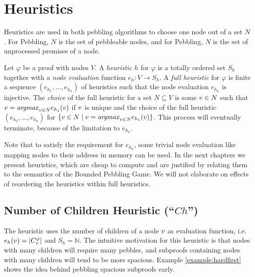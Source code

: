 \section{Heuristics}
\label{sec:heuristics}

Heuristics are used in both pebbling algorithms to choose one node out of a set $N$. 
For  Pebbling, $N$ is the set of pebbleable nodes, and for  Pebbling, $N$ is the set of unprocessed premises of a node. 

\begin{definition}

Let $\varphi$ be a proof with nodes $V$.
A \emph{heuristic} $h$ for $\varphi$ is a totally ordered set $S_h$ together with a \emph{node evaluation} function $e_h: V \rightarrow S_h$.
A \emph{full heuristic} for $\varphi$ is finite a sequence $(e_{h_1}, \ldots, e_{h_n})$ of heuristics such that the node evaluation $e_{h_n}$ is injective.
The \emph{choice} of the full heuristic for a set $N \subseteq V$ is some $v \in N$ such that $v = \mathit{argmax}_{v \in N} e_{h_1}(v)$ if $v$ is unique and the choice of the full heuristic $(e_{h_2},\ldots,e_{h_n})$ for $\{v \in N \mid v = \mathit{argmax}_{v \in N} e_{h_1}(v)\}$. 
This process will eventually terminate, because of the limitation to $e_{h_n}$.

\end{definition}

Note that to satisfy the requirement for $e_{h_n}$, some trivial node evaluation like mapping nodes to their address in memory can be used.
In the next chapters we present heuristics, which are cheap to compute and are justified by relating them to the semantics of the Bounded Pebbling Game.
We will not elaborate on effects of reordering the heuristics within full heuristics.

\subsection{Number of Children Heuristic (``$Ch$'')}
\label{sec:children}
The  heuristic uses the number of children of a node $v$ as evaluation function, i.e. $e_h(v) = |C_{v}^{\varphi}|$ and $S_h = \mathbb{N}$.
The intuitive motivation for this heuristic is that nodes with many children will require many pebbles, and subproofs containing nodes with many children will tend to be more spacious.
Example \ref{example:hardfirst} shows the idea behind pebbling spacious subproofs early.


